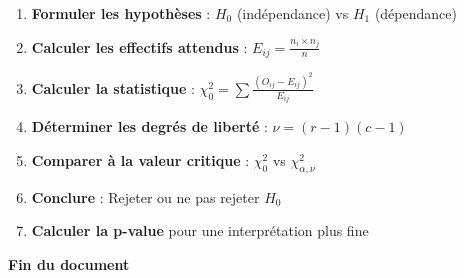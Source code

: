 \documentclass[11pt,a4paper]{article}
\newcommand{\chideux}{\chi^2}
\begin{document}
\begin{enumerate}
    \item \textbf{Formuler les hypothèses} : $H_0$ (indépendance) vs $H_1$ (dépendance)
    \item \textbf{Calculer les effectifs attendus} : $E_{ij} = \frac{n_i \times n_j}{n}$
    \item \textbf{Calculer la statistique} : $\chideux_0 = \sum \frac{(O_{ij} - E_{ij})^2}{E_{ij}}$
    \item \textbf{Déterminer les degrés de liberté} : $\nu = (r-1)(c-1)$
    \item \textbf{Comparer à la valeur critique} : $\chideux_0$ vs $\chideux_{\alpha, \nu}$
    \item \textbf{Conclure} : Rejeter ou ne pas rejeter $H_0$
    \item \textbf{Calculer la p-value} pour une interprétation plus fine
\end{enumerate}

\vspace{2cm}

\begin{center}
\textbf{Fin du document}
\end{center}
\end{document}
